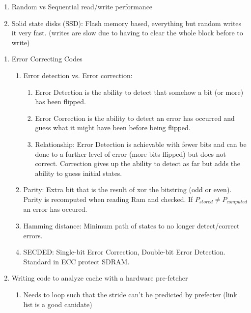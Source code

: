 \documentclass[12pt]{article}
\renewcommand{\=}[1]{\stackrel{#1}{=}} %
\theoremstyle{definition}
\theoremstyle{remark}
\begin{document}
\begin{center}
\begin{enumerate}
\begin{enumerate}
    \item Random vs Sequential read/write performance
    \item Solid state disks (SSD): Flash memory based, everything but
      random writes it very fast. (writes are slow due to having to
      clear the whole block before to write)
    \end{enumerate}
    \begin{enumerate}
    \item Error Correcting Codes
      \begin{enumerate}
      \item Error detection vs. Error correction:
        \begin{enumerate}
        \item Error Detection is the ability to detect that somehow a
          bit (or more) has been flipped.
        \item Error Correction is the ability to detect an error has
          occurred and guess what it might have been before being flipped.
        \item Relationship: Error Detection is achievable with fewer
          bits and can be done to a further level of error (more bits
          flipped) but does not correct. Correction gives up the
          ability to detect as far but adds the ability to guess
          initial states.
        \end{enumerate}
      \item Parity: Extra bit that is the result of xor the bitstring
        (odd or even). Parity is recomputed when reading Ram and
        checked. If $P_{stored} \neq P_{computed}$ an error has occured.
      \item Hamming distance: Minimum path of states to no longer
        detect/correct errors.
      \item SECDED: Single-bit Error Correction, Double-bit Error
        Detection. Standard in ECC protect SDRAM.
      \end{enumerate}
    \item Writing code to analyze cache with a hardware pre-fetcher
      \begin{enumerate}
      \item Needs to loop such that the stride can't be predicted by
        prefecter (link list is a good canidate)
      \end{enumerate}
    \end{enumerate}
  \end{enumerate}
    
\end{center}
\end{document}
